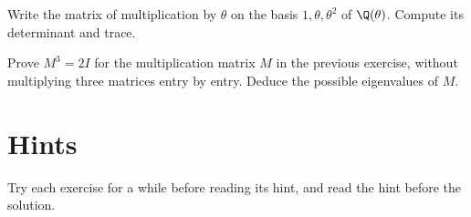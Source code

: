 \begin{exercise}[$\star\star$]\label{ex:v13-extra-03-3}
Write the matrix of multiplication by $\theta$ on the basis $1,\theta,\theta^2$ of $\Q(\theta)$. Compute its determinant and trace.
\end{exercise}

\begin{exercise}[$\star\star\star$]\label{ex:v13-extra-03-4}
Prove $M^3=2I$ for the multiplication matrix $M$ in the previous exercise, without multiplying three matrices entry by entry. Deduce the possible eigenvalues of $M$.
\end{exercise}

\section{Hints}

Try each exercise for a while before reading its hint, and read the hint before the solution.

